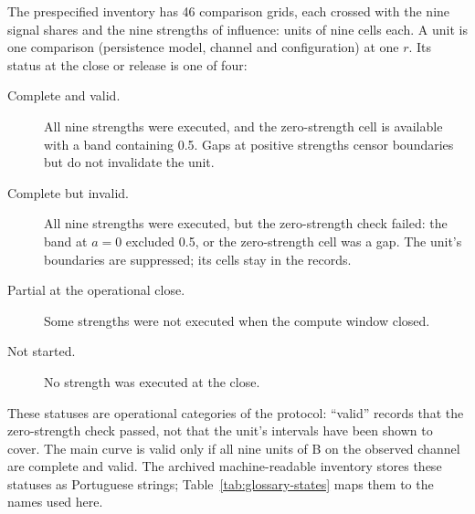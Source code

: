 
The prespecified inventory has 46 comparison grids, each crossed with the nine signal shares and the nine strengths of influence:  units of nine cells each. A unit is one comparison (persistence model, channel and configuration) at one $r$. Its status at the close or release is one of four:
\begin{description}
\item[Complete and valid.] All nine strengths were executed, and the zero-strength cell is available with a band containing 0.5. Gaps at positive strengths censor boundaries but do not invalidate the unit.
\item[Complete but invalid.] All nine strengths were executed, but the zero-strength check failed: the band at $a=0$ excluded 0.5, or the zero-strength cell was a gap. The unit's boundaries are suppressed; its cells stay in the records.
\item[Partial at the operational close.] Some strengths were not executed when the compute window closed.
\item[Not started.] No strength was executed at the close.
\end{description}
These statuses are operational categories of the protocol: ``valid'' records that the zero-strength check passed, not that the unit's intervals have been shown to cover. The main curve is valid only if all nine units of B on the observed channel are complete and valid. The archived machine-readable inventory stores these statuses as Portuguese strings; Table~\ref{tab:glossary-states} maps them to the names used here.

